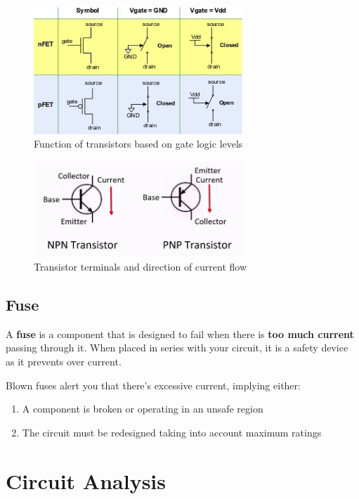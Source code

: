 \documentclass{article}
\begin{document}
\begin{figure} [h]
    \centering
    \includegraphics[width=0.7\textwidth]{img/TransistorSignal.jpg}
    \caption{Function of transistors based on gate logic levels}
    \label{fig:TranSignal}
\end{figure}

\begin{figure} [h]
    \centering
    \includegraphics[width=0.7\textwidth]{img/TransistorCurrent.png}
    \caption{Transistor terminals and direction of current flow}
    \label{fig:TranCurr}
\end{figure}

\subsection{Fuse}

A \textbf{fuse} is a component that is designed to fail when there is \textbf{too much current} passing through it. When placed in series with your circuit, it is a safety device as it prevents over current.

Blown fuses alert you that there’s excessive current, implying either: 
\begin{enumerate}
    \item A component is broken or operating in an unsafe region
    \item The circuit must be redesigned taking into account maximum ratings
\end{enumerate}

\section{Circuit Analysis}
\end{document}
